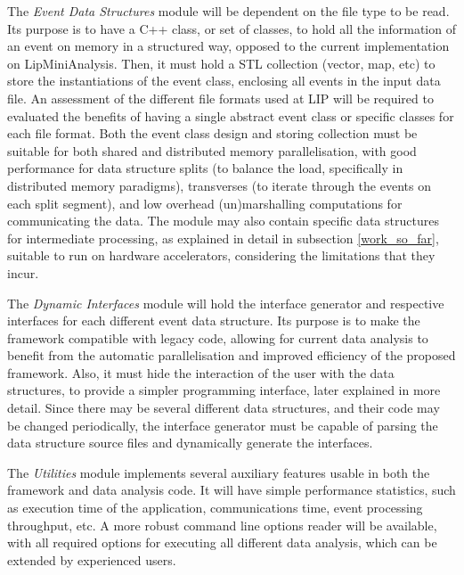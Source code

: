 The \textit{Event Data Structures} module will be dependent on the file type to be read. Its purpose is to have a C++ class, or set of classes, to hold all the information of an event on memory in a structured way, opposed to the current implementation on LipMiniAnalysis. Then, it must hold a STL collection (vector, map, etc) to store the instantiations of the event class, enclosing all events in the input data file. An assessment of the different file formats used at LIP will be required to evaluated the benefits of having a single abstract event class or specific classes for each file format. Both the event class design and storing collection must be suitable for both shared and distributed memory parallelisation, with good performance for data structure splits (to balance the load, specifically in distributed memory paradigms), transverses (to iterate through the events on each split segment), and low overhead (un)marshalling computations for communicating the data. The module may also contain specific data structures for intermediate processing, as explained in detail in subsection \ref{work_so_far}, suitable to run on hardware accelerators, considering the limitations that they incur.

The \textit{Dynamic Interfaces} module will hold the interface generator and respective interfaces for each different event data structure. Its purpose is to make the framework compatible with legacy code, allowing for current data analysis to benefit from the automatic parallelisation and improved efficiency of the proposed framework. Also, it must hide the interaction of the user with the data structures, to provide a simpler programming interface, later explained in more detail. Since there may be several different data structures, and their code may be changed periodically, the interface generator must be capable of parsing the data structure source files and dynamically generate the interfaces.

The \textit{Utilities} module implements several auxiliary features usable in both the framework and data analysis code. It will have simple performance statistics, such as execution time of the application, communications time, event processing throughput, etc. A more robust command line options reader will be available, with all required options for executing all different data analysis, which can be extended by experienced users.

